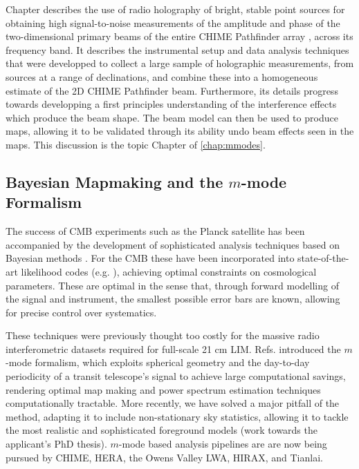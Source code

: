 Chapter \cite{chap:holography} describes the use of radio holography of bright, stable point sources for obtaining high signal-to-noise measurements of the amplitude and phase of the two-dimensional primary beams of the entire CHIME Pathfinder array \citep{chimepath1}, across its frequency band. It describes the instrumental setup and data analysis techniques that were developped to collect a large sample of holographic measurements, from sources at a range of declinations, and combine these into a homogeneous estimate of the 2D CHIME Pathfinder beam. Furthermore, its details progress towards developping a first principles understanding of the interference effects which produce the beam shape. The beam model can then be used to produce maps, allowing it to be validated through its ability undo beam effects seen in the maps. This discussion is the topic Chapter of \ref{chap:mmodes}.

\subsection{\label{sec:bg:subsec:mmodes} Bayesian Mapmaking and the $m$-mode Formalism}

The success of CMB experiments such as the Planck satellite has been accompanied by the development of sophisticated analysis techniques based on Bayesian methods \citep{bondjaffeknox}. For the CMB these have been incorporated into state-of-the-art likelihood codes (e.g. \citep{commander}), achieving optimal constraints on cosmological parameters. These are optimal in the sense that, through forward modelling of the signal and instrument, the smallest possible error bars are known, allowing for precise control over systematics.

These techniques were previously thought too costly for the massive radio interferometric datasets required for full-scale 21 cm LIM. Refs. \citep{mmodes1, mmodes2} introduced the $m$-mode formalism, which exploits spherical geometry and the day-to-day periodicity of a transit telescope's signal to achieve large computational savings, rendering optimal map making and power spectrum estimation techniques computationally tractable. More recently, we have solved a major pitfall of the method, adapting it to include non-stationary sky statistics, allowing it to tackle the most realistic and sophisticated foreground models \citep{bergeroppermann} (work towards the applicant's PhD thesis). $m$-mode based analysis pipelines are are now being pursued by CHIME, HERA, the Owens Valley LWA, HIRAX, and Tianlai.